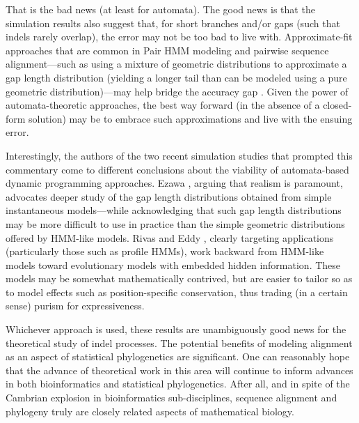 \documentclass{bmcart}
\begin{document}
That is the bad news (at least for automata).
The good news is that the simulation results also suggest that,
for short branches \color{red} and/or gaps (such that indels rarely overlap)\color{black}, the error may not be too bad to live with.
Approximate-fit approaches that are common in Pair HMM modeling and pairwise sequence alignment---such as using a mixture
of geometric distributions to approximate a gap length distribution (yielding a longer tail than can be modeled
using a pure geometric distribution)---may help bridge the accuracy gap \cite{DoEtAl2005}.
Given the power of automata-theoretic approaches, the best way forward
(in the absence of a closed-form solution) may be to embrace such approximations and live with the ensuing error.

Interestingly, the authors of the two recent simulation studies that prompted this commentary
come to different conclusions about the viability of automata-based dynamic programming approaches.
Ezawa \cite{Ezawa2016a,Ezawa2016b}, arguing that realism is paramount, advocates deeper study of the
gap length distributions obtained from simple instantaneous models---while acknowledging that such gap length distributions
may be more difficult to use in practice than the simple geometric distributions offered by HMM-like models.
Rivas and Eddy \cite{RivasEddy2015}, clearly targeting applications (particularly those such as profile HMMs),
work backward from HMM-like models toward evolutionary models with embedded
hidden information.
These models may be somewhat mathematically contrived,
\color{red}
but are easier to tailor so as to model effects such as position-specific conservation,
thus trading (in a certain sense) purism for expressiveness.
\color{black}

Whichever approach is used, these results are unambiguously good news for the theoretical study of indel processes.
The potential benefits of modeling alignment as an aspect of statistical phylogenetics are significant.
One can reasonably hope that the advance of theoretical work in this area 
will continue to inform advances in both bioinformatics and statistical phylogenetics.
After all, and in spite of the Cambrian explosion in bioinformatics sub-disciplines,
sequence alignment and phylogeny truly are closely related aspects of mathematical biology.



\end{document}
